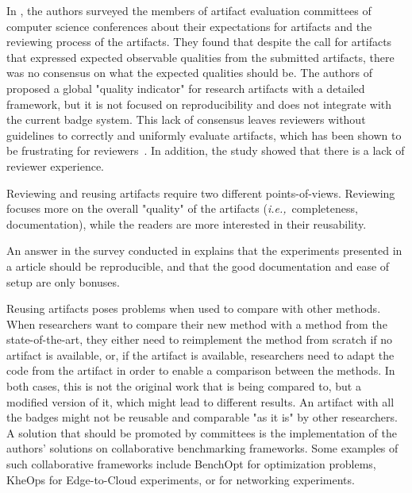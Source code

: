 \documentclass[sigconf,natbib=false]{acmart}
\newcommand{\ie}{\emph{i.e.,}}
\begin{document}
In \cite{hermann2020community}, the authors surveyed the members of artifact evaluation committees of computer science conferences about their expectations for artifacts and the reviewing process of the artifacts. 
They found that despite the call for artifacts that expressed expected observable qualities from the submitted artifacts, there was no consensus on what the expected qualities should be.
The authors of \cite{castell2024towards} proposed a global "quality indicator" for research artifacts with a detailed framework, but it is not focused on reproducibility and does not integrate with the current badge system.
This lack of consensus leaves reviewers without guidelines to correctly and uniformly evaluate artifacts, which has been shown to be frustrating for reviewers\ \cite{beller2020will}.
In addition, the study showed that there is a lack of reviewer experience.

Reviewing and reusing artifacts require two different points-of-views.
Reviewing focuses more on the overall "quality" of the artifacts (\ie\ completeness, documentation), while the readers are more interested in their reusability.

An answer in the survey conducted in \cite{hermann2020community} explains that the experiments presented in a article should be reproducible, and that the good documentation and ease of setup are only bonuses.

Reusing artifacts poses problems when used to compare with other methods.
When researchers want to compare their new method with a method from the state-of-the-art, they either need to reimplement the method from scratch if no artifact is available, or, if the artifact is available, researchers need to adapt the code from the artifact in order to enable a comparison between the methods.
In both cases, this is not the original work that is being compared to, but a modified version of it, which might lead to different results.
An artifact with all the badges might not be reusable and comparable "as it is" by other researchers.
A solution that should be promoted by committees is the implementation of the authors' solutions on collaborative benchmarking frameworks.
Some examples of such collaborative frameworks include BenchOpt \cite{moreau2022benchopt} for optimization problems, KheOps \cite{rosendo2023kheops} for Edge-to-Cloud experiments, or \cite{sharma2017towards} for networking experiments.
\end{document}
